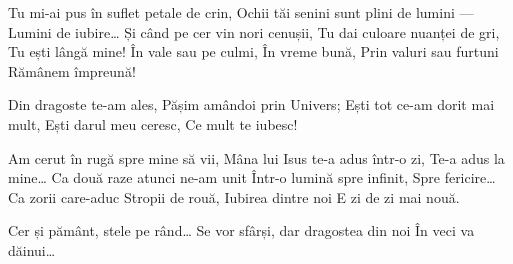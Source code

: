 \beginverse
Tu mi-ai pus în suflet petale de crin,
Ochii tăi senini sunt plini de lumini —
Lumini de iubire…
Și când pe cer vin nori cenușii,
Tu dai culoare nuanței de gri,
Tu ești lângă mine!
În vale sau pe culmi,
În vreme bună,
Prin valuri sau furtuni
Rămânem împreună!
\endverse

\beginchorus
Din dragoste te-am ales,
Pășim amândoi prin Univers;
Ești tot ce-am dorit mai mult,
Ești darul meu ceresc,
Ce mult te iubesc!
\endchorus

\beginverse
Am cerut în rugă spre mine să vii,
Mâna lui Isus te-a adus într-o zi,
Te-a adus la mine…
Ca două raze atunci ne-am unit
Într-o lumină spre infinit,
Spre fericire…
Ca zorii care-aduc
Stropii de rouă,
Iubirea dintre noi
E zi de zi mai nouă.
\endverse

\beginverse*
Cer și pământ, stele pe rând…
Se vor sfârși, dar dragostea din noi
În veci va dăinui…
\endverse
\endsong